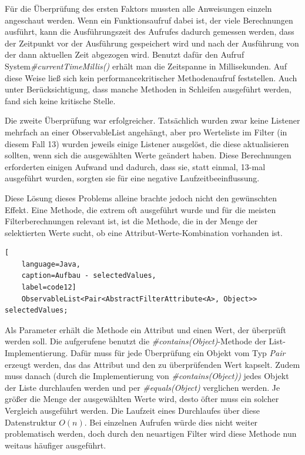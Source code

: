 Für die Überprüfung des ersten Faktors mussten alle Anweisungen einzeln angeschaut werden. Wenn ein Funktionsaufruf dabei ist, der viele Berechnungen ausführt, kann die Ausführungszeit des Aufrufes dadurch gemessen werden, dass der Zeitpunkt vor der Ausführung gespeichert wird und nach der Ausführung von der dann aktuellen Zeit abgezogen wird. Benutzt dafür den Aufruf System\textit{\#currentTimeMillis()} erhält man die Zeitspanne in Millisekunden. Auf diese Weise ließ sich kein performancekritischer Methodenaufruf feststellen. Auch unter Berücksichtigung, dass manche Methoden in Schleifen ausgeführt werden, fand sich keine kritische Stelle.

Die zweite Überprüfung war erfolgreicher. Tatsächlich wurden zwar keine Listener mehrfach an einer ObservableList angehängt, aber pro Werteliste im Filter (in diesem Fall 13) wurden jeweils einige Listener ausgelöst, die diese aktualisieren sollten, wenn sich die ausgewählten Werte geändert haben. Diese Berechnungen erforderten einigen Aufwand und dadurch, dass sie, statt einmal, 13-mal ausgeführt wurden, sorgten sie für eine negative Laufzeitbeeinflussung.

Diese Lösung dieses Problems alleine brachte jedoch nicht den gewünschten Effekt. Eine Methode, die extrem oft ausgeführt wurde und für die meisten Filterberechnungen relevant ist, ist die Methode, die in der Menge der selektierten Werte sucht, ob eine Attribut-Werte-Kombination vorhanden ist.

\begin{lstlisting}[
    language=Java,
    caption=Aufbau - selectedValues,
    label=code12]
	ObservableList<Pair<AbstractFilterAttribute<A>, Object>> selectedValues;
\end{lstlisting}

Als Parameter erhält die Methode ein Attribut und einen Wert, der überprüft werden soll. Die aufgerufene benutzt die \textit{\#contains(Object)}-Methode der List-Implementierung. Dafür muss für jede Überprüfung ein Objekt vom Typ \textit{Pair} erzeugt werden, das das Attribut und den zu überprüfenden Wert kapselt. Zudem muss danach (durch die Implementierung von \textit{\#contains(Object))} jedes Objekt der Liste durchlaufen werden und per \textit{\#equals(Object)} verglichen werden. Je größer die Menge der ausgewählten Werte wird, desto öfter muss ein solcher Vergleich ausgeführt werden. Die Laufzeit eines Durchlaufes über diese Datenstruktur $O(n)$. Bei einzelnen Aufrufen würde dies nicht weiter problematisch werden, doch durch den neuartigen Filter wird diese Methode nun weitaus häufiger ausgeführt.
